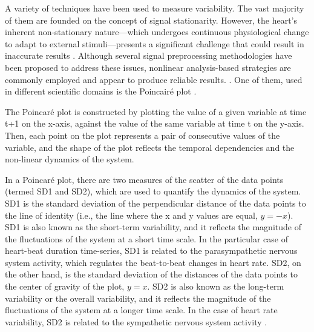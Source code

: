 \documentclass[%
preprint,
 amsmath,amssymb,
 aps,
]{revtex4-2}
\begin{document}
A variety of techniques have been used to measure variability. The vast majority of them are founded on the concept of signal stationarity. However, the heart's inherent non-stationary nature---which undergoes continuous physiological change to adapt to external stimuli---presents a significant challenge that could result in inaccurate results \citep{Marwan_2007}. Although several signal preprocessing methodologies have been proposed to address these issues, nonlinear analysis-based strategies are commonly employed and appear to produce reliable results. \citep{Marwan_2002, Aubert_2003, Marwan_2007, Giuliani_1998, 
Rajendra_Acharya_2006, Webber_1994, Henriques_2020}. One of them, used in different scientific domains is the Poincairé plot \citep{Hoshi_2016, Webber_1994, Voss_2008}. 


The Poincaré plot is constructed by plotting the value of a given variable at time t+1 on the x-axis, against the value of the same variable at time t on the y-axis. Then, each point on the plot represents a pair of consecutive values of the variable, and the shape of the plot reflects the temporal dependencies and the non-linear dynamics of the system.


In a Poincaré plot, there are two measures of the scatter of the data points (termed SD1 and SD2), which are used to quantify the dynamics of the system. SD1 is the standard deviation of the perpendicular distance of the data points to the line of identity (i.e., the line where the x and y values are equal, $y = -x$). SD1 is also known as the short-term variability, and it reflects the magnitude of the fluctuations of the system at a short time scale. In the particular case of heart-beat duration time-series, SD1 is related to the parasympathetic nervous system activity, which regulates the beat-to-beat changes in heart rate. SD2, on the other hand, is the standard deviation of the distances of the data points to the center of gravity of the plot, $y = x$. SD2 is also known as the long-term variability or the overall variability, and it reflects the magnitude of the fluctuations of the system at a longer time scale. In the case of heart rate variability, SD2 is related to the sympathetic nervous system activity \citep{Zimatore_2022}.
\end{document}
